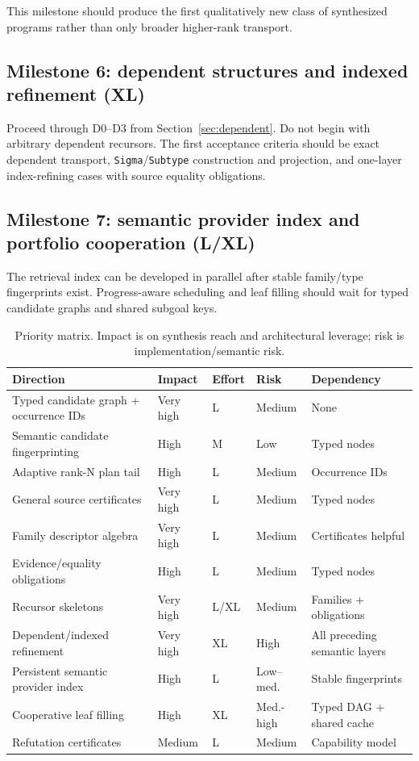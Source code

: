 \documentclass[11pt]{article}
\newcommand{\code}[1]{\texttt{#1}}
\begin{document}
This milestone should produce the first qualitatively new class of synthesized
programs rather than only broader higher-rank transport.

\subsection{Milestone 6: dependent structures and indexed refinement (XL)}

Proceed through D0--D3 from Section~\ref{sec:dependent}.  Do not begin with
arbitrary dependent recursors.  The first acceptance criteria should be exact
dependent transport, \code{Sigma}/\code{Subtype} construction and projection,
and one-layer index-refining cases with source equality obligations.

\subsection{Milestone 7: semantic provider index and portfolio cooperation (L/XL)}

The retrieval index can be developed in parallel after stable family/type
fingerprints exist.  Progress-aware scheduling and leaf filling should wait for
typed candidate graphs and shared subgoal keys.

\begin{table}[H]
\centering
\small
\caption{Priority matrix.  Impact is on synthesis reach and architectural
leverage; risk is implementation/semantic risk.}
\begin{tabularx}{\textwidth}{L{4.7cm} C{1.35cm} C{1.35cm} C{1.55cm} Y}
\toprule
\textbf{Direction} & \textbf{Impact} & \textbf{Effort} & \textbf{Risk} &
\textbf{Dependency} \\
\midrule
Typed candidate graph + occurrence IDs & Very high & L & Medium & None \\
Semantic candidate fingerprinting & High & M & Low & Typed nodes \\
Adaptive rank-N plan tail & High & L & Medium & Occurrence IDs \\
General source certificates & Very high & L & Medium & Typed nodes \\
Family descriptor algebra & Very high & L & Medium & Certificates helpful \\
Evidence/equality obligations & High & L & Medium & Typed nodes \\
Recursor skeletons & Very high & L/XL & Medium & Families + obligations \\
Dependent/indexed refinement & Very high & XL & High & All preceding semantic layers \\
Persistent semantic provider index & High & L & Low--med. & Stable fingerprints \\
Cooperative leaf filling & High & XL & Med.-high & Typed DAG + shared cache \\
Refutation certificates & Medium & L & Medium & Capability model \\
\bottomrule
\end{tabularx}
\end{table}
\end{document}
